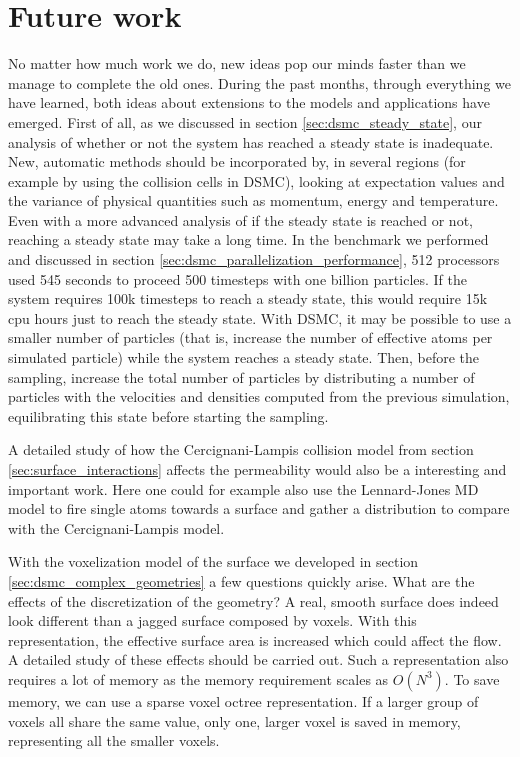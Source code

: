 \section{Future work}
No matter how much work we do, new ideas pop our minds faster than we manage to complete the old ones. During the past months, through everything we have learned, both ideas about extensions to the models and applications have emerged. First of all, as we discussed in section \ref{sec:dsmc_steady_state}, our analysis of whether or not the system has reached a steady state is inadequate. New, automatic methods should be incorporated by, in several regions (for example by using the collision cells in DSMC), looking at expectation values and the variance of physical quantities such as momentum, energy and temperature. Even with a more advanced analysis of if the steady state is reached or not, reaching a steady state may take a long time. In the benchmark we performed and discussed in section \ref{sec:dsmc_parallelization_performance}, 512 processors used 545 seconds to proceed 500 timesteps with one billion particles. If the system requires 100k timesteps to reach a steady state, this would require 15k cpu hours just to reach the steady state. With DSMC, it may be possible to use a smaller number of particles (that is, increase the number of effective atoms per simulated particle) while the system reaches a steady state. Then, before the sampling, increase the total number of particles by distributing a number of particles with the velocities and densities computed from the previous simulation, equilibrating this state before starting the sampling.

A detailed study of how the Cercignani-Lampis collision model from section \ref{sec:surface_interactions} affects the permeability would also be a interesting and important work. Here one could for example also use the Lennard-Jones MD model to fire single atoms towards a surface and gather a distribution to compare with the Cercignani-Lampis model.

With the voxelization model of the surface we developed in section \ref{sec:dsmc_complex_geometries} a few questions quickly arise. What are the effects of the discretization of the geometry? A real, smooth surface does indeed look different than a jagged surface composed by voxels. With this representation, the effective surface area is increased which could affect the flow. A detailed study of these effects should be carried out. Such a representation also requires a lot of memory as the memory requirement scales as $O(N^3)$. To save memory, we can use a sparse voxel octree representation. If a larger group of voxels all share the same value, only one, larger voxel is saved in memory, representing all the smaller voxels.

